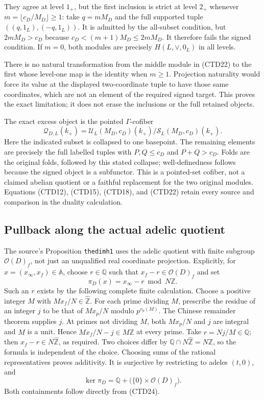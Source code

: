 They agree at level $1_+$, but the first inclusion is strict
at level $2_+$ whenever $m=\lfloor c_D/M_D\rfloor\ge1$:
take $q=mM_D$ and the full supported tuple
$((q,1_L),(-q,1_L))$. It is admitted by the all-subset condition,
but $2mM_D>c_D$ because $c_D<(m+1)M_D\le2mM_D$.
It therefore fails the signed condition. If $m=0$, both modules
are precisely $H(L,\vee,0_L)$ in all levels.

There is no natural transformation from the middle module in
(CTD22) to the first whose level-one map is the identity when
$m\ge1$. Projection naturality would force its value at the
displayed two-coordinate tuple to have those same coordinates,
which are not an element of the required signed target.
This proves the exact limitation; it does not erase the
inclusions or the full retained objects.

The exact excess object is the pointed $\Gamma$-cofiber
\begin{equation}\tag{CTD23}
\mathcal Q_{D,L}(k_+)
=\mathcal U_L(M_D,c_D)(k_+)/
       \mathcal S_L(M_D,c_D)(k_+).
\end{equation}
Here the indicated subset is collapsed to one basepoint.
The remaining elements are precisely the full labelled tuples
with $P,Q\le c_D$ and $P+Q>c_D$.
Folds are the original folds, followed by this stated collapse;
well-definedness follows because the signed object is a
subfunctor. This is a pointed-set cofiber, not a claimed
abelian quotient or a faithful replacement for the two original
modules. Equations (CTD12), (CTD15), (CTD18), and (CTD22)
retain every source and comparison in the duality calculation.

\subsection{Pullback along the actual adelic quotient}

The source's Proposition \texttt{thedimh1} uses the adelic
quotient with finite subgroup $\mathcal O(D)_f$, not just an
unqualified real coordinate projection. Explicitly, for
$x=(x_\infty,x_f)\in\mathbb A$, choose $r\in\mathbb Q$ such that
$x_f-r\in\mathcal O(D)_f$ and set
\begin{equation}\tag{CTD24}
\pi_D(x)=x_\infty-r\bmod N\mathbb Z.
\end{equation}
Such an $r$ exists by the following complete finite calculation.
Choose a positive integer $M$ with $M x_f/N\in\widehat{\mathbb Z}$.
For each prime dividing $M$, prescribe the residue of an integer
$j$ to be that of $M x_p/N$ modulo $p^{v_p(M)}$.
The Chinese remainder theorem supplies $j$. At primes not
dividing $M$, both $M x_p/N$ and $j$ are integral and $M$ is a
unit. Hence $M x_f/N-j\in M\widehat{\mathbb Z}$ at every prime.
Take $r=Nj/M\in\mathbb Q$; then
$x_f-r\in N\widehat{\mathbb Z}$, as required. Two choices differ by
$\mathbb Q\cap N\widehat{\mathbb Z}=N\mathbb Z$, so the
formula is independent of the choice. Choosing sums of the
rational representatives proves additivity. It is surjective
by restricting to adeles $(t,0)$, and
\[
\ker\pi_D=\mathbb Q+
 \bigl(\{0\}\times\mathcal O(D)_f\bigr).
\]
Both containments follow directly from (CTD24).

